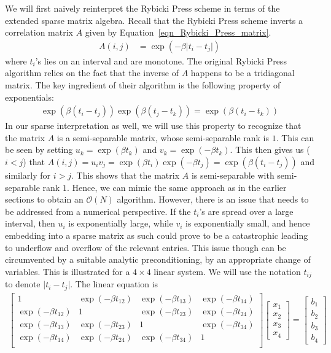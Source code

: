 \documentclass[final,leqno]{siamltex}
\begin{document}
We will first naively reinterpret the Rybicki Press scheme in terms of the extended sparse matrix algebra. Recall that the Rybicki Press scheme inverts a correlation matrix $A$ given by Equation~\eqref{eqn_Rybicki_Press_matrix}.
\begin{align}
A(i,j) & = \exp\left(-\beta \lvert t_i - t_j \rvert\right)
\label{eqn_Rybicki_Press_matrix}
\end{align}
where $t_i$'s lies on an interval and are monotone. The original Rybicki Press algorithm relies on the fact that the inverse of $A$ happens to be a tridiagonal matrix. The key ingredient of their algorithm is the following property of exponentials:
\begin{align}
\exp\left(\beta (t_i-t_j) \right)\exp\left(\beta (t_j-t_k) \right) = \exp\left(\beta (t_i-t_k)\right)
\end{align}
In our sparse interpretation as well, we will use this property to recognize that the matrix $A$ is a semi-separable matrix, whose semi-separable rank is $1$. This can be seen by setting $u_k = \exp(\beta t_k)$ and $v_k = \exp(-\beta t_k)$. This then gives us ($i<j$) that $A(i,j) = u_i v_j = \exp(\beta t_i) \exp(-\beta t_j) = \exp(\beta(t_i-t_j))$ and similarly for $i>j$. This shows that the matrix $A$ is semi-separable with semi-separable rank $1$. Hence, we can mimic the same approach as in the earlier sections to obtain an $\mathcal{O}(N)$ algorithm. However, there is an issue that needs to be addressed from a numerical perspective. If the $t_i$'s are spread over a large interval, then $u_i$ is exponentially large, while $v_i$ is exponentially small, and hence embedding into a sparse matrix as such could prove to be a catastrophic leading to underflow and overflow of the relevant entries. This issue though can be circumvented by a suitable analytic preconditioning, by an appropriate change of variables. This is illustrated for a $4 \times 4$ linear system. We will use the notation $t_{ij}$ to denote $\lvert t_i - t_j\lvert$. The linear equation is
\begin{align}
\begin{bmatrix}
1 & \exp(-\beta t_{12}) & \exp(-\beta t_{13}) & \exp(-\beta t_{14})\\
\exp(-\beta t_{12}) & 1 & \exp(-\beta t_{23}) & \exp(-\beta t_{24})\\
\exp(-\beta t_{13}) & \exp(-\beta t_{23}) & 1 & \exp(-\beta t_{34})\\
\exp(-\beta t_{14}) & \exp(-\beta t_{24}) & \exp(-\beta t_{34}) & 1\\
\end{bmatrix}
\begin{bmatrix}
x_1\\x_2\\x_3\\x_4
\end{bmatrix}
=
\begin{bmatrix}
b_1\\b_2\\b_3\\b_4
\end{bmatrix}
\end{align}
\end{document}
